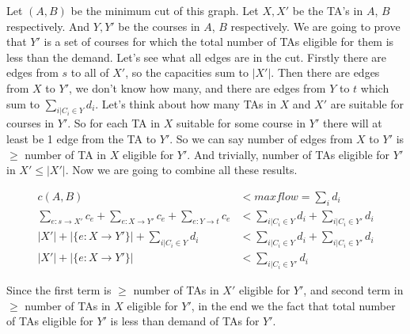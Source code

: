 \documentclass[12pt]{report}
\begin{document}
\begin{enumerate}[label=\textbf{\arabic*.}]
  Let $(A, B)$ be the minimum cut of this graph. Let $X, X'$ be the TA's in $A$, $B$ respectively. And $Y, Y'$ be the courses in $A$, $B$ 
  respectively. We are going to prove that $Y'$ is a set of courses for which the total number of TAs eligible for them is less than the demand.
  Let's see what all edges are in the cut. Firstly there are edges from $s$ to all of $X'$, so the capacities sum to $|X'|$. Then there are edges
  from $X$ to $Y'$, we don't know how many, and there are edges from $Y$ to $t$ which sum to $\sum_{i|C_i \in Y} d_i$. Let's think about how many TAs
  in $X$ and $X'$ are suitable for courses in $Y'$. So for each TA in $X$ suitable for some course in $Y'$ there will at least be 1 edge from the TA 
  to $Y'$. So we can say number of edges from $X$ to $Y'$ is $\geq$ number of TA in $X$ eligible for $Y'$. And trivially, number of TAs eligible for
  $Y'$ in $X' \leq |X'|$. 
  Now we are going to combine all these results.
  
  \begin{align*}
    c(A,B) &< maxflow = \sum_i d_i \\
    \sum_{e:s \rightarrow X'} c_e + \sum_{e:X \rightarrow Y'} c_e + \sum_{e:Y \rightarrow t} c_e &< \sum_{i|C_i \in Y} d_i + \sum_{i|C_i \in Y'} d_i \\
    |X'| + |\{e:X \rightarrow Y'\}| + \sum_{i|C_i \in Y} d_i &< \sum_{i|C_i \in Y} d_i + \sum_{i|C_i \in Y'} d_i \\
    |X'| + |\{e:X \rightarrow Y'\}| &< \sum_{i|C_i \in Y'} d_i
  \end{align*}

  Since the first term is $\geq$ number of TAs in $X'$ eligible for $Y'$, and second term in $\geq$ number of TAs in $X$ eligible for $Y'$, in the end
  we the fact that total number of TAs eligible for $Y'$ is less than demand of TAs for $Y'$.


\end{enumerate}
\end{document}
